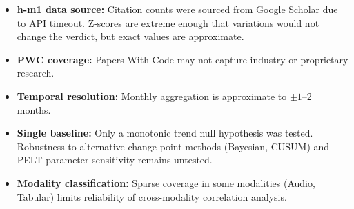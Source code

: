 \begin{itemize}
\item \textbf{h-m1 data source:} Citation counts were sourced from Google Scholar due to API timeout. Z-scores are extreme enough that variations would not change the verdict, but exact values are approximate.
\end{itemize}

\begin{itemize}
\item \textbf{PWC coverage:} Papers With Code may not capture industry or proprietary research.
\end{itemize}

\begin{itemize}
\item \textbf{Temporal resolution:} Monthly aggregation is approximate to $\pm 1$--2 months.
\end{itemize}

\begin{itemize}
\item \textbf{Single baseline:} Only a monotonic trend null hypothesis was tested. Robustness to alternative change-point methods (Bayesian, CUSUM) and PELT parameter sensitivity remains untested.
\end{itemize}

\begin{itemize}
\item \textbf{Modality classification:} Sparse coverage in some modalities (Audio, Tabular) limits reliability of cross-modality correlation analysis.
\end{itemize}
